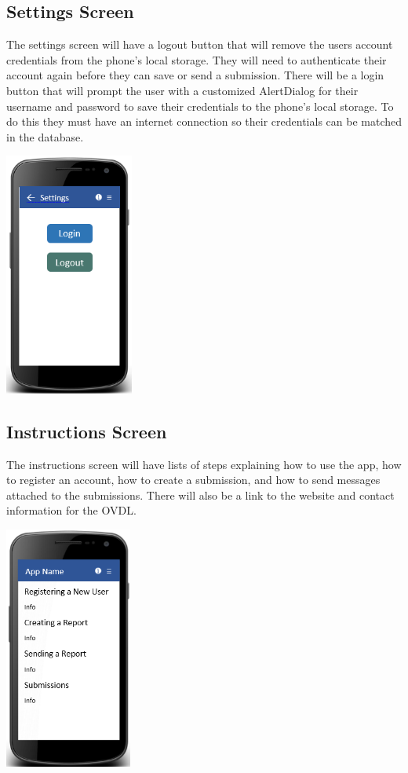 \documentclass[onecolumn, draftclsnofoot,10pt, compsoc]{IEEEtran}
\begin{document}
\subsection{Settings Screen}
The settings screen will have a logout button that will remove the users account credentials from the phone’s local storage. They will need to authenticate their account again before they can save or send a submission. There will be a login button that will prompt the user with a customized AlertDialog for their username and password to save their credentials to the phone’s local storage. To do this they must have an internet connection so their credentials can be matched in the database. 
\begin{center}
\includegraphics[height=8cm]{settingsscreen.png}
\end{center}

\subsection{Instructions Screen}
The instructions screen will have lists of steps explaining how to use the app, how to register an account, how to create a submission, and how to send messages attached to the submissions. There will also be a link to the website and contact information for the OVDL. 
\newline
\begin{center}
\includegraphics[height=8cm]{instructionsscreen.png}
\end{center}
\end{document}
